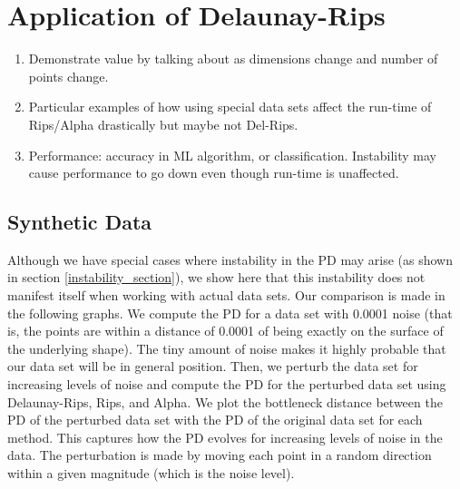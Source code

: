 \documentclass[letterpaper,titlepage]{article}
\begin{document}
    
\section{Application of Delaunay-Rips}
\begin{enumerate}
    \item Demonstrate value by talking about as dimensions change and number of points change.
    \item Particular examples of how using special data sets affect the run-time of Rips/Alpha drastically but maybe not Del-Rips.
    \item Performance: accuracy in ML algorithm, or classification. Instability may cause performance to go down even though run-time is unaffected.
\end{enumerate}

\subsection{Synthetic Data}

    Although we have special cases where instability in the PD may arise (as shown in section \ref{instability_section}), we show here that this instability does not manifest itself when working with actual data sets. Our comparison is made in the following graphs. We compute the PD for a data set with 0.0001 noise (that is, the points are within a distance of 0.0001 of being exactly on the surface of the underlying shape). The tiny amount of noise makes it highly probable that our data set will be in general position. Then, we perturb the data set for increasing levels of noise and compute the PD for the perturbed data set using Delaunay-Rips, Rips, and Alpha. We plot the bottleneck distance between the PD of the perturbed data set with the PD of the original data set for each method. This captures how the PD evolves for increasing levels of noise in the data. The perturbation is made by moving each point in a random direction within a given magnitude (which is the noise level).
\end{document}
